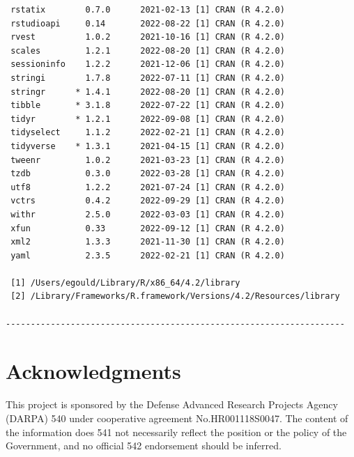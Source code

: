 \documentclass[article]{jss}
\begin{document}
\begin{verbatim}
 rstatix        0.7.0      2021-02-13 [1] CRAN (R 4.2.0)
 rstudioapi     0.14       2022-08-22 [1] CRAN (R 4.2.0)
 rvest          1.0.2      2021-10-16 [1] CRAN (R 4.2.0)
 scales         1.2.1      2022-08-20 [1] CRAN (R 4.2.0)
 sessioninfo    1.2.2      2021-12-06 [1] CRAN (R 4.2.0)
 stringi        1.7.8      2022-07-11 [1] CRAN (R 4.2.0)
 stringr      * 1.4.1      2022-08-20 [1] CRAN (R 4.2.0)
 tibble       * 3.1.8      2022-07-22 [1] CRAN (R 4.2.0)
 tidyr        * 1.2.1      2022-09-08 [1] CRAN (R 4.2.0)
 tidyselect     1.1.2      2022-02-21 [1] CRAN (R 4.2.0)
 tidyverse    * 1.3.1      2021-04-15 [1] CRAN (R 4.2.0)
 tweenr         1.0.2      2021-03-23 [1] CRAN (R 4.2.0)
 tzdb           0.3.0      2022-03-28 [1] CRAN (R 4.2.0)
 utf8           1.2.2      2021-07-24 [1] CRAN (R 4.2.0)
 vctrs          0.4.2      2022-09-29 [1] CRAN (R 4.2.0)
 withr          2.5.0      2022-03-03 [1] CRAN (R 4.2.0)
 xfun           0.33       2022-09-12 [1] CRAN (R 4.2.0)
 xml2           1.3.3      2021-11-30 [1] CRAN (R 4.2.0)
 yaml           2.3.5      2022-02-21 [1] CRAN (R 4.2.0)

 [1] /Users/egould/Library/R/x86_64/4.2/library
 [2] /Library/Frameworks/R.framework/Versions/4.2/Resources/library

--------------------------------------------------------------------
\end{verbatim}

\hypertarget{acknowledgments}{%
\section*{Acknowledgments}\label{acknowledgments}}

This project is sponsored by the Defense Advanced Research Projects
Agency (DARPA) 540 under cooperative agreement No.HR001118S0047. The
content of the information does 541 not necessarily reflect the position
or the policy of the Government, and no official 542 endorsement should
be inferred.


  
\end{document}
